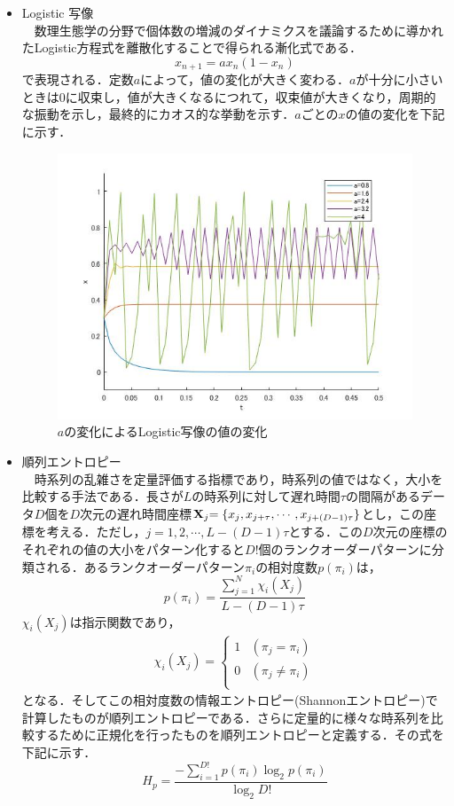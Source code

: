 \documentclass[autodetect-engine,dvipdfmx-if-dvi,ja=standard,a4paper,11pt]{bxjsarticle} %
\begin{document}
\begin{itemize}
\item Logistic 写像\\%
　数理生態学の分野で個体数の増減のダイナミクスを議論するために導かれたLogistic方程式を離散化することで得られる漸化式である\cite{lo}．
\begin{equation}
x_{n+1}=ax_{n}(1-x_{n})
\end{equation}
で表現される．定数$a$によって，値の変化が大きく変わる．$a$が十分に小さいときは0に収束し，値が大きくなるにつれて，収束値が大きくなり，周期的な振動を示し，最終的にカオス的な挙動を示す．$a$ごとの$x$の値の変化を下記に示す．

\begin{figure}[H]%
\begin{center}
\includegraphics[width=.4\textwidth]{Logistic_result.jpg}
\end{center}
\caption{$a$の変化によるLogistic写像の値の変化}%
\label{fig:logstic}
\end{figure}


\item 順列エントロピー\\%
　時系列の乱雑さを定量評価する指標であり，時系列の値ではなく，大小を比較する手法である．長さが$L$の時系列に対して遅れ時間$\tau$の間隔があるデータ$D$個を$D$次元の遅れ時間座標${\bf X}_{\sl j}{\sl=\{ x_j,x_{j+\tau},\cdots ,x_{j+(D-1)\tau} \}} $とし，この座標を考える．ただし，$j=1,2,\cdots,L-(D-1)\tau$とする．この$D$次元の座標のそれぞれの値の大小をパターン化すると$D!$個のランクオーダーパターンに分類される．あるランクオーダーパターン$\pi_i$の相対度数$p(\pi_i)$は，
\begin{equation}
p(\pi_i)=\dfrac{\displaystyle\sum^N_{j=1}\chi_i(X_j)}{L-(D-1)\tau}
\end{equation}
$\chi_i(X_j)$は指示関数であり，
\begin{eqnarray}
\chi_i(X_j)=\left\{ \begin{array}{ll}
1 &  (\pi_j=\pi_i) \\
0 & (\pi_j\neq\pi_i) \\
\end{array} \right.
\end{eqnarray}
となる．そしてこの相対度数の情報エントロピー(Shannonエントロピー)で計算したものが順列エントロピーである．さらに定量的に様々な時系列を比較するために正規化を行ったものを順列エントロピーと定義する．その式を下記に示す．
\begin{equation}
H_p=\dfrac{-\displaystyle\sum_{i=1}^{D!} p(\pi_i) \log_2 p(\pi_i)}{\log_2 D!}
\end{equation}
\\


\end{itemize}
\end{document}
